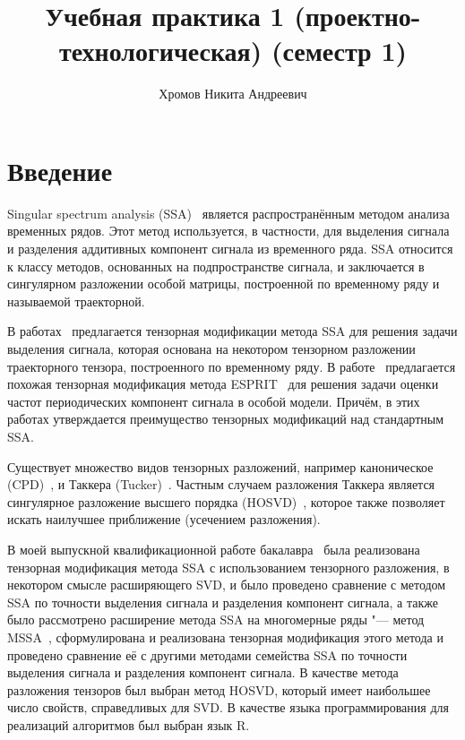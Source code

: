 \documentclass[specialist,
  substylefile=spbu_report.rtx,
subf,href,colorlinks=true, 12pt]{disser}
\theoremstyle{plain}
\theoremstyle{definition}
\theoremstyle{remark}
\begin{document}
\title{Учебная практика 1 (проектно-технологическая) (семестр 1)}
\author{Хромов Никита Андреевич}
\date{\number\year}
\maketitle

\tableofcontents

\section{Введение}\label{sec:intro}
Singular spectrum analysis (SSA)~\cite{ssa} является
распространённым методом анализа временных рядов.
Этот метод используется, в частности, для выделения сигнала и
разделения аддитивных компонент сигнала из
временного ряда.
SSA относится к классу методов, основанных на подпространстве
сигнала, и заключается в сингулярном разложении
особой матрицы, построенной по временному ряду и называемой траекторной.

В работах~\cite{TSSA, TSSA-improved} предлагается тензорная
модификации метода SSA для решения
задачи выделения сигнала, которая основана на некотором тензорном
разложении траекторного тензора,
построенного по временному ряду.
В работе~\cite{hosvd-hooi-separation} предлагается похожая
тензорная модификация
метода ESPRIT~\cite{esprit} для решения задачи оценки частот
периодических компонент сигнала
в особой модели.
Причём, в этих работах утверждается преимущество тензорных
модификаций над стандартным SSA\@.

Существует множество видов тензорных разложений, например
каноническое \linebreak (CPD)~\cite{parafac1, parafac2},
и Таккера (Tucker)~\cite{tucker}. Частным случаем разложения
Таккера является сингулярное
разложение высшего порядка (HOSVD)~\cite{hosvd}, которое также
позволяет искать наилучшее приближение
(усечением разложения).

В моей выпускной квалификационной работе бакалавра~\cite{Thesis2024} была
реализована тензорная модификация
метода SSA с использованием тензорного разложения, в некотором
смысле расширяющего SVD,
и было проведено сравнение с методом SSA по точности выделения
сигнала и разделения
компонент сигнала, а также было рассмотрено
расширение метода SSA на многомерные ряды "--- метод
MSSA~\cite{ssa-2020},
сформулирована и реализована тензорная модификация этого метода и
проведено сравнение её с другими методами
семейства SSA по точности выделения сигнала и разделения компонент сигнала.
В качестве метода разложения тензоров был выбран метод HOSVD, который имеет
наибольшее число
свойств, справедливых для SVD.
В качестве языка программирования для реализаций алгоритмов был выбран язык R.
\end{document}
